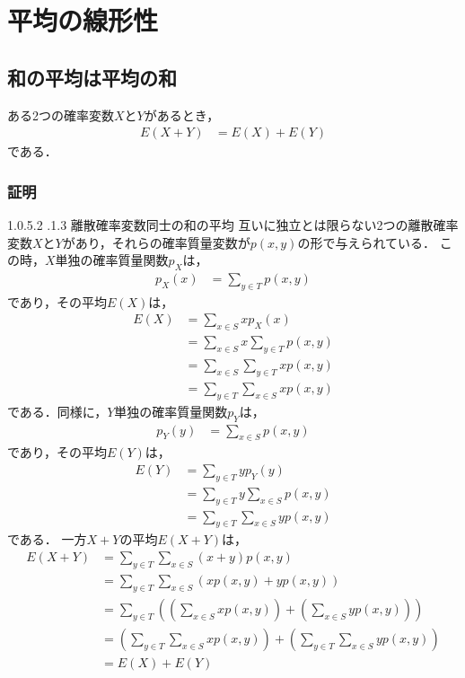 \documentclass[dvipdfmx]{jsarticle}
\makeatletter
\newcommand{\subsubsubsection}{\@startsection{paragraph}{4}{\z@}%
 {1.0\Cvs \@plus.5\Cdp \@minus.2\Cdp}%
 {.1\Cvs \@plus.3\Cdp}%
 {\reset@font\sffamily\normalsize}
}
\makeatother
\begin{document}
 \section{平均の線形性}
 \subsection{和の平均は平均の和}
ある2つの確率変数$X$と$Y$があるとき，
 \begin{align}
  E\left(X+Y\right)&=E\left(X\right)+E\left(Y\right)
 \end{align}
である．
 \subsubsection{証明}
 \subsubsubsection{離散確率変数同士の和の平均}
互いに独立とは限らない2つの離散確率変数$X$と$Y$があり，それらの確率質量変数が$p\left(x,y\right)$の形で与えられている．
この時，$X$単独の確率質量関数$p_X$は，
 \begin{align}
  p_X\left(x\right)&=\sum_{y\in T}p\left(x,y\right)
 \end{align}
であり，その平均$E\left(X\right)$は，
 \begin{align}
  E\left(X\right)&=\sum_{x\in S}xp_X\left(x\right)\nonumber\\
  &=\sum_{x\in S}x\sum_{y\in T}p\left(x,y\right)\nonumber\\
  &=\sum_{x\in S}\sum_{y\in T}xp\left(x,y\right)\nonumber\\
  &=\sum_{y\in T}\sum_{x\in S}xp\left(x,y\right)
 \end{align}
である．同様に，$Y$単独の確率質量関数$p_Y$は，
 \begin{align}
  p_Y\left(y\right)&=\sum_{x\in S}p\left(x,y\right)
 \end{align}
であり，その平均$E\left(Y\right)$は，
 \begin{align}
  E\left(Y\right)&=\sum_{y\in T}yp_Y\left(y\right)\nonumber\\
  &=\sum_{y\in T}y\sum_{x\in S}p\left(x,y\right)\nonumber\\
  &=\sum_{y\in T}\sum_{x\in S}yp\left(x,y\right)
 \end{align}
である．
一方$X+Y$の平均$E\left(X+Y\right)$は，
 \begin{align}
  E\left(X+Y\right)&=\sum_{y\in T}\sum_{x\in S}\left(x+y\right)p\left(x,y\right)\nonumber\\
  &=\sum_{y\in T}\sum_{x\in S}\left(xp\left(x,y\right)+yp\left(x,y\right)\right)\nonumber\\
  &=\sum_{y\in T}\left(\left(\sum_{x\in S}xp\left(x,y\right)\right)+\left(\sum_{x\in S}yp\left(x,y\right)\right)\right)\nonumber\\
  &=\left(\sum_{y\in T}\sum_{x\in S}xp\left(x,y\right)\right)+\left(\sum_{y\in T}\sum_{x\in S}yp\left(x,y\right)\right)\nonumber\\
  &=E\left(X\right)+E\left(Y\right)
 \end{align}
\end{document}
